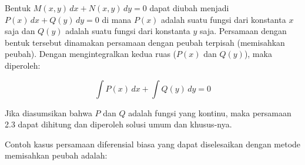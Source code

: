 Bentuk \begin{math} M(x, y) \, dx + N(x, y) \, dy = 0 \end{math} dapat diubah menjadi \begin{math} P(x) \, dx + Q(y) \, dy = 0 \end{math} di mana \begin{math} P(x) \end{math} adalah suatu fungsi dari konstanta \begin{math} x \end{math} saja dan \begin{math} Q(y) \end{math} adalah suatu fungsi dari konstanta \begin{math} y \end{math} saja. Persamaan dengan bentuk tersebut dinamakan persamaan dengan peubah terpisah (memisahkan peubah). Dengan mengintegralkan kedua ruas (\begin{math} P(x) \end{math} dan \begin{math} Q(y) \end{math}), maka diperoleh:

\begin{equation} \int P(x) \, dx + \int Q(y) \, dy = 0 \end{equation}

Jika diasumsikan bahwa \begin{math} P \end{math} dan \begin{math} Q \end{math} adalah fungsi yang kontinu, maka persamaan 2.3 dapat dihitung dan diperoleh solusi umum dan khusus-nya.

Contoh kasus persamaan diferensial biasa yang dapat diselesaikan dengan metode memisahkan peubah adalah:

